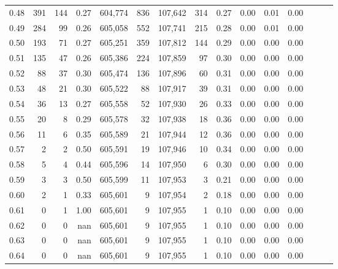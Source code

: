 \begin{tabular}{rrrrrrrrrrrrrrr}
0.48 &      391 &     144 &  0.27 &  604,774 &      836 &  107,642 &      314 &  0.27 &  0.00 &  0.01 &      0.00 \\
0.49 &      284 &      99 &  0.26 &  605,058 &      552 &  107,741 &      215 &  0.28 &  0.00 &  0.01 &      0.00 \\
0.50 &      193 &      71 &  0.27 &  605,251 &      359 &  107,812 &      144 &  0.29 &  0.00 &  0.00 &      0.00 \\
0.51 &      135 &      47 &  0.26 &  605,386 &      224 &  107,859 &       97 &  0.30 &  0.00 &  0.00 &      0.00 \\
0.52 &       88 &      37 &  0.30 &  605,474 &      136 &  107,896 &       60 &  0.31 &  0.00 &  0.00 &      0.00 \\
0.53 &       48 &      21 &  0.30 &  605,522 &       88 &  107,917 &       39 &  0.31 &  0.00 &  0.00 &      0.00 \\
0.54 &       36 &      13 &  0.27 &  605,558 &       52 &  107,930 &       26 &  0.33 &  0.00 &  0.00 &      0.00 \\
0.55 &       20 &       8 &  0.29 &  605,578 &       32 &  107,938 &       18 &  0.36 &  0.00 &  0.00 &      0.00 \\
0.56 &       11 &       6 &  0.35 &  605,589 &       21 &  107,944 &       12 &  0.36 &  0.00 &  0.00 &      0.00 \\
0.57 &        2 &       2 &  0.50 &  605,591 &       19 &  107,946 &       10 &  0.34 &  0.00 &  0.00 &      0.00 \\
0.58 &        5 &       4 &  0.44 &  605,596 &       14 &  107,950 &        6 &  0.30 &  0.00 &  0.00 &      0.00 \\
0.59 &        3 &       3 &  0.50 &  605,599 &       11 &  107,953 &        3 &  0.21 &  0.00 &  0.00 &      0.00 \\
0.60 &        2 &       1 &  0.33 &  605,601 &        9 &  107,954 &        2 &  0.18 &  0.00 &  0.00 &      0.00 \\
0.61 &        0 &       1 &  1.00 &  605,601 &        9 &  107,955 &        1 &  0.10 &  0.00 &  0.00 &      0.00 \\
0.62 &        0 &       0 &   nan &  605,601 &        9 &  107,955 &        1 &  0.10 &  0.00 &  0.00 &      0.00 \\
0.63 &        0 &       0 &   nan &  605,601 &        9 &  107,955 &        1 &  0.10 &  0.00 &  0.00 &      0.00 \\
0.64 &        0 &       0 &   nan &  605,601 &        9 &  107,955 &        1 &  0.10 &  0.00 &  0.00 &      0.00 \\

\end{tabular}
